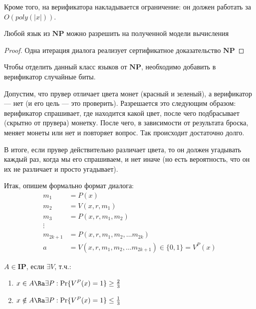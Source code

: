 Кроме того, на верификатора накладывается ограничение: он должен работать за \(O(poly(|x|))\).

\begin{note}
    Любой язык из \(\mathbf{NP}\) можно разрешить на полученной модели вычисления
\end{note}
\begin{proof}
    Одна итерация диалога реализует сертификатное доказательство \(\mathbf{NP}\)
\end{proof}

Чтобы отделить данный класс языков от \(\mathbf{NP}\), необходимо добавить в верификатор случайные биты.

\begin{example}
    Допустим, что прувер отличает цвета монет (красный и зеленый), а верификатор --- нет (и его цель --- это проверить). Разрешается это следующим образом: верификатор спрашивает, где находится какой цвет, после чего подбрасывает (скрытно от прувера) монетку. После чего, в зависимости от результата броска, меняет монеты или нет и повторяет вопрос. Так происходит достаточно долго.

    В итоге, если прувер действительно различает цвета, то он должен угадывать каждый раз, когда мы его спрашиваем, и нет иначе (но есть вероятность, что он их не различает и просто угадывает).
\end{example}

Итак, опишем формально формат диалога:
\begin{align*}
    m_1& = P(x) \\
    m_2& = V(x, r, m_1) \\
    m_3& = P(x, r, m_1, m_2) \\
    \vdots \\
    m_{2k + 1}& = P(x, r, m_1, m_2, \dots m_{2k}) \\
    a& = V(x, r, m_1, m_2, \dots m_{2k + 1}) \in \{0, 1\} = V^P(x)
\end{align*}

\begin{definition}
    \(A \in \mathbf{IP}\), если \(\exists V\), т.ч.:
    \begin{enumerate}
        \item \(x \in A \Ra \exists P: \Pr\{V^P(x) = 1\} \ge \frac{2}{3}\)
        \item \(x \notin A \Ra \exists P: \Pr\{V^P(x) = 1\} \le \frac{1}{3}\)
    \end{enumerate}
\end{definition}

